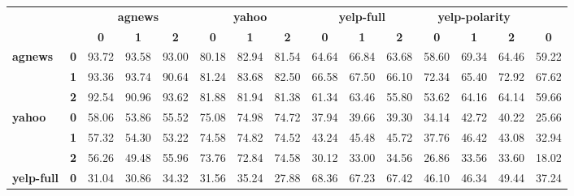 \documentclass[11pt,a4paper]{article}
\begin{document}
\begin{table}[ht]
	\centering
	\fontsize{8}{12}
	\selectfont
	\begin{tabular}{llccccccccccccc}
		\toprule
		&            & \multicolumn{3}{c}{\textbf{agnews}}  & \multicolumn{3}{c}{\textbf{yahoo}}   & \multicolumn{3}{c}{\textbf{yelp-full}} & \multicolumn{3}{c}{\textbf{yelp-polarity}} \\
		&            & \textbf{0} & \textbf{1} & \textbf{2} & \textbf{0} & \textbf{1} & \textbf{2} & \textbf{0}  & \textbf{1}  & \textbf{2} & \textbf{0}   & \textbf{1}   & \textbf{2}   & \textbf{0} \\
		\hline
		\multirow{3}{*}{\textbf{agnews}}        & \textbf{0} & 93.72      & 93.58      & 93.00      & 80.18      & 82.94      & 81.54      & 64.64       & 66.84       & 63.68      & 58.60        & 69.34        & 64.46        & 59.22      \\
		& \textbf{1} & 93.36      & 93.74      & 90.64      & 81.24      & 83.68      & 82.50      & 66.58       & 67.50       & 66.10      & 72.34        & 65.40        & 72.92        & 67.62      \\
		& \textbf{2} & 92.54      & 90.96      & 93.62      & 81.88      & 81.94      & 81.38      & 61.34       & 63.46       & 55.80      & 53.62        & 64.16        & 64.14        & 59.66      \\
		\hline
		\multirow{3}{*}{\textbf{yahoo}}         & \textbf{0} & 58.06      & 53.86      & 55.52      & 75.08      & 74.98      & 74.72      & 37.94       & 39.66       & 39.30      & 34.14        & 42.72        & 40.22        & 25.66      \\
		& \textbf{1} & 57.32      & 54.30      & 53.22      & 74.58      & 74.82      & 74.52      & 43.24       & 45.48       & 45.72      & 37.76        & 46.42        & 43.08        & 32.94      \\
		& \textbf{2} & 56.26      & 49.48      & 55.96      & 73.76      & 72.84      & 74.58      & 30.12       & 33.00       & 34.56      & 26.86        & 33.56        & 33.60        & 18.02      \\
		\hline
		\multirow{3}{*}{\textbf{yelp-full}}     & \textbf{0} & 31.04      & 30.86      & 34.32      & 31.56      & 35.24      & 27.88      & 68.36       & 67.23       & 67.42      & 46.10        & 46.34        & 49.44        & 37.24      \\

\end{tabular}
\end{table}
\end{document}
